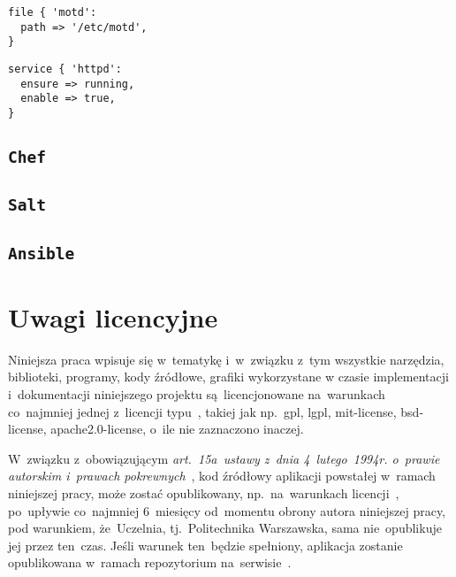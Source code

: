 \documentclass[thesis]{subfiles}
\begin{document}
\begin{lstlisting}[numbers=none,caption={Manifest \texttt{Puppet} gwarantujący istnienie pliku \hreftt{https://en.wikipedia.org/wiki/Motd_(Unix)}{/etc/motd}},label=puppet-motd-example]
file { 'motd':
  path => '/etc/motd',
}
\end{lstlisting}

\begin{lstlisting}[numbers=none,caption={Manifest \texttt{Puppet} gwarantujący, że \emph{\gls{daemon}} \hreftt{https://httpd.apache.org/}{httpd} jest włączony i~działa},label=puppet-httpd-example]
service { 'httpd':
  ensure => running,
  enable => true,
}
\end{lstlisting}

\subsection{\texttt{Chef}}
\subsection{\texttt{Salt}}
\subsection{\texttt{Ansible}}


\section{Uwagi licencyjne}

Niniejsza praca wpisuje się w~tematykę  i~w~związku z~tym wszystkie narzędzia, biblioteki, programy, kody źródłowe, grafiki wykorzystane w czasie implementacji i~dokumentacji niniejszego projektu są~licencjonowane na~warunkach co~najmniej jednej z~licencji typu~, takiej jak np.~\gls{gpl}, \gls{lgpl}, \gls{mit-license}, \gls{bsd-license}, \gls{apache2.0-license}, o~ile nie zaznaczono inaczej.

W~związku z~obowiązującym \emph{art.~15a~ustawy z~dnia 4~lutego~1994r. o~prawie autorskim i~prawach pokrewnych}~\cite{papp}, kod źródłowy aplikacji powstałej w~ramach niniejszej pracy, może zostać opublikowany, np.~na~warunkach licencji~, po~upływie co~najmniej 6~miesięcy od~momentu obrony autora niniejszej pracy, pod warunkiem, że~Uczelnia, tj.~Politechnika Warszawska, sama nie~opublikuje jej przez ten~czas. Jeśli warunek ten~będzie spełniony, aplikacja zostanie opublikowana w~ramach repozytorium na~serwisie~.
\end{document}
